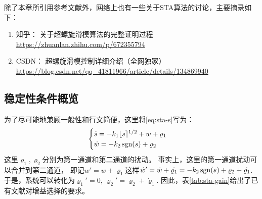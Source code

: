 除了本章所引用参考文献外，网络上也有一些关于STA算法的讨论，主要摘录如下：
\begin{enumerate}
	\item 知乎： 关于超螺旋滑模算法的完整证明过程 \url{https://zhuanlan.zhihu.com/p/672355794}
	\item CSDN： 超螺旋滑模控制详细介绍（全网独家） \url{https://blog.csdn.net/qq_41811966/article/details/134869940}
\end{enumerate}

\subsection{稳定性条件概览}

为了尽可能地兼顾一般性和行文简便，这里将\eqref{eq:sta-s}写为：
\begin{equation}
	\begin{cases}
		\dot{s}=-k_1 \lfloor s \rceil^{1/2}+w+\varrho_1\\
		\dot{w}=-k_2 \operatorname{sgn}(s)+\varrho_2
	\end{cases}
\end{equation}
这里$\varrho_1,\varrho_2$分别为第一通道和第二通道的扰动。
事实上，这里的第一通道扰动可以合并到第二通道，
即记$w'=w+\varrho_1$这样$\dot{w}'=\dot{w}+\dot{\varrho_1}=-k_2 \operatorname{sgn}(s)+\varrho_2+\dot{\varrho_1}$.
于是，系统可以转化为$\varrho_1'=0$, $\varrho_2'=\varrho_2+\dot{\varrho}_1$.
因此，表\ref{tab:sta-gain}给出了已有文献对增益选择的要求。

